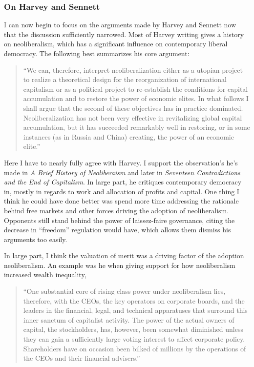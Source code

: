 \documentclass[12pt,a4paper]{article}
\begin{document}
\subsubsection{On Harvey and Sennett}
\vspace*{-8pt}
I can now begin to focus on the arguments made by Harvey and Sennett now that the discussion sufficiently narrowed. Most of Harvey writing gives a history on neoliberalism, which has a significant influence on contemporary liberal democracy. The following best summarizes his core argument:
\begin{quote}\color{G-Moon}
``We can, therefore, interpret neoliberalization either as a utopian project to realize a theoretical design for the reorganization of international capitalism or as a political project to re-establish the conditions for capital accumulation and to restore the power of economic elites. In what follows I shall argue that the second of these objectives has in practice dominated. Neoliberalization has not been very effective in  revitalizing global capital accumulation, but it has succeeded remarkably well in restoring, or in some instances (as in Russia and China) creating, the power of an economic elite.''~\cite{neo}
\end{quote}
Here I have to nearly fully agree with Harvey. I support the observation's he's made in \textit{A Brief History of Neoliberaism} and later in \textit{Seventeen Contradictions and the End of Capitalism}. In large part, he critiques contemporary democracy in, mostly in regards to work and allocation of profits and capital. One thing I think he could have done better was spend more time addressing the rationale behind free markets and other forces driving the adoption of neoliberalism. Opponents still stand behind the power of laissez-faire governance, citing the decrease in ``freedom'' regulation would have, which allows them dismiss his arguments too easily.

In large part, I think the valuation of merit was a driving factor of the adoption neoliberalism. An example was he when giving support for how neoliberalism increased wealth inequality,
\begin{quote}\color{G-Moon}
   ``One substantial core of rising class power under 
neoliberalism lies, therefore, with the CEOs, the key 
operators on corporate boards, and the leaders in the 
financial, legal, and technical apparatuses that surround this 
inner sanctum of capitalist activity. The power of the actual 
owners of capital, the stockholders, has, however, been 
somewhat diminished unless they can gain a sufficiently 
large voting interest to affect corporate policy. Shareholders 
have on occasion been bilked of millions by the operations 
of the CEOs and their financial advisers.''~\cite{neo}
\end{quote}
\end{document}
